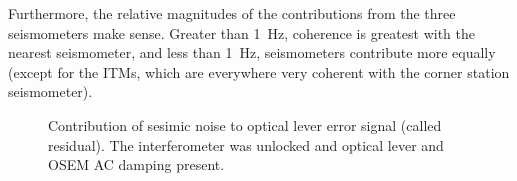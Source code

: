 Furthermore, the relative magnitudes of the contributions from the
three seismometers make sense. Greater than 1~Hz, coherence is
greatest with the nearest seismometer, and less than 1~Hz,
seismometers contribute more equally (except for the ITMs, which are
everywhere very coherent with the corner station seismometer).

\begin{figure}
\begin{centering}
\caption[Contribution of sesimic noise to optical lever error
signal]{Contribution of sesimic noise to optical lever error signal
  (called residual). The interferometer was unlocked and optical lever
  and OSEM AC damping present.}
\label{fig:OLcontributions}
\end{centering}
\end{figure}


